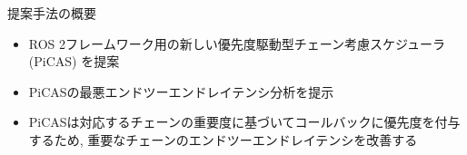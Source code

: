 
\begin{frame}{提案手法の概要}
    \begin{itemize}
        \item ROS 2フレームワーク用の新しい優先度駆動型チェーン考慮スケジューラ (PiCAS) を提案
        \item PiCASの最悪エンドツーエンドレイテンシ分析を提示
        \item PiCASは対応するチェーンの重要度に基づいてコールバックに優先度を付与するため, 重要なチェーンのエンドツーエンドレイテンシを改善する
    \end{itemize}
\end{frame}
